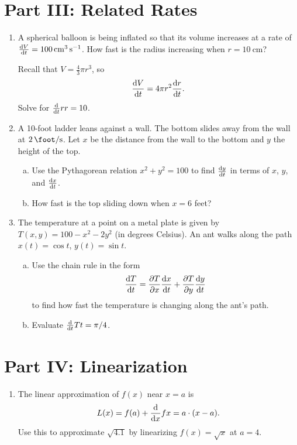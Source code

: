 \documentclass[11pt]{article}
\begin{document}
\section*{Part III: Related Rates}

\begin{enumerate}[resume]
\item A spherical balloon is being inflated so that its volume increases at a rate of $\diff{V}{t} = \SI{100}{\centi\meter\cubed\per\second}$. How fast is the radius increasing when $r = \SI{10}{\centi\meter}$?

Recall that $V = \frac{4}{3}\pi r^3$, so
\[
  \diff{V}{t} = 4\pi r^2 \diff{r}{t}.
\]
Solve for $\diff*{r}{t}{r = 10}$.

\item A 10-foot ladder leans against a wall. The bottom slides away from the wall at $\SI{2}{\foot\per\second}$. Let $x$ be the distance from the wall to the bottom and $y$ the height of the top.
\begin{enumerate}[(a)]
  \item Use the Pythagorean relation $x^2 + y^2 = 100$ to find $\diff{y}{t}$ in terms of $x$, $y$, and $\diff{x}{t}$.
  \item How fast is the top sliding down when $x = 6$ feet?
\end{enumerate}

\item The temperature at a point on a metal plate is given by $T(x, y) = 100 - x^2 - 2y^2$ (in degrees Celsius). An ant walks along the path $x(t) = \cos t$, $y(t) = \sin t$.
\begin{enumerate}[(a)]
  \item Use the chain rule in the form
  \[
    \diff{T}{t} = \diffp{T}{x} \diff{x}{t} + \diffp{T}{y} \diff{y}{t}
  \]
  to find how fast the temperature is changing along the ant's path.
  \item Evaluate $\diff*{T}{t}{t = \pi/4}$.
\end{enumerate}
\end{enumerate}

\section*{Part IV: Linearization}

\begin{enumerate}[resume]
\item The linear approximation of $f(x)$ near $x = a$ is
\[
  L(x) = f(a) + \diff*{f}{x}{x=a} \cdot (x - a).
\]
Use this to approximate $\sqrt{4.1}$ by linearizing $f(x) = \sqrt{x}$ at $a = 4$.
\end{enumerate}
\end{document}
